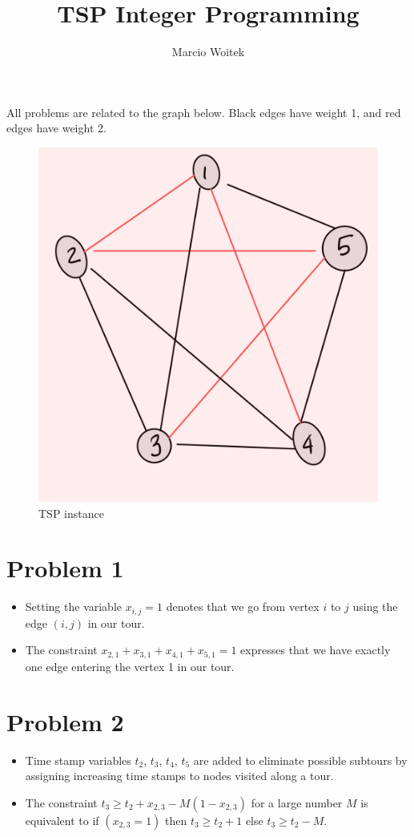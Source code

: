 \documentclass[11pt]{article}
\author{Marcio Woitek}
\date{}
\title{TSP Integer Programming}
\begin{document}
\maketitle
\thispagestyle{empty}
\pagestyle{empty}

All problems are related to the graph below. Black edges have weight 1, and red
edges have weight 2.
\begin{figure}[H]
  \centering
  \includegraphics[scale=0.15]{held_karp_graph.jpeg}
  \caption{TSP instance}
\end{figure}

\section*{Problem 1}
\label{sec:orgb2611d7}
\begin{itemize}
\item Setting the variable \(x_{i,j}=1\) denotes that we go from vertex \(i\) to
\(j\) using the edge \((i,j)\) in our tour.
\item The constraint \(x_{2,1}+x_{3,1}+x_{4,1}+x_{5,1}=1\) expresses that we have
exactly one edge entering the vertex 1 in our tour.
\end{itemize}

\section*{Problem 2}
\label{sec:orgca4dc97}
\begin{itemize}
\item Time stamp variables \(t_2\), \(t_3\), \(t_4\), \(t_5\) are added to eliminate
possible subtours by assigning increasing time stamps to nodes visited along a
tour.
\item The constraint \(t_3\geq t_2+x_{2,3}-M(1-x_{2,3})\) for a large number \(M\)
is equivalent to if \((x_{2,3}=1)\) then \(t_3\geq t_2+1\) else \(t_3\geq t_2-M\).
\end{itemize}
\end{document}
